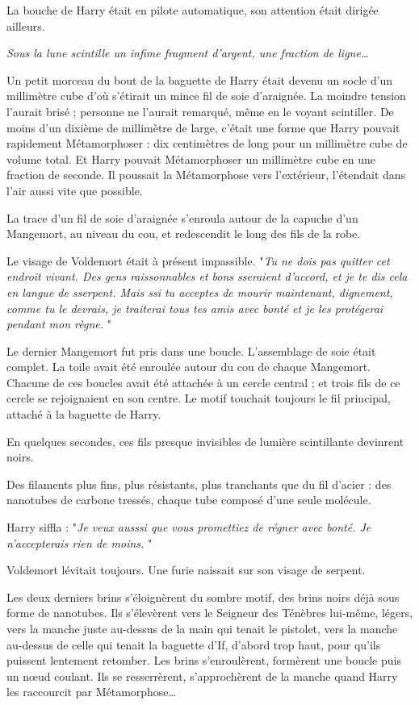 La bouche de Harry était en pilote automatique, son attention était dirigée ailleurs.

\emph{Sous la lune scintille un infime fragment d'argent, une fraction de ligne…} 

Un petit morceau du bout de la baguette de Harry était devenu un socle d'un millimètre cube d'où s'étirait un mince fil de soie d'araignée. La moindre tension l'aurait brisé ; personne ne l'aurait remarqué, même en le voyant scintiller. De moins d'un dixième de millimètre de large, c'était une forme que Harry pouvait rapidement Métamorphoser : dix centimètres de long pour un millimètre cube de volume total. Et Harry pouvait Métamorphoser un millimètre cube en une fraction de seconde. Il poussait la Métamorphose vers l'extérieur, l'étendait dans l'air aussi vite que possible.

La trace d'un fil de soie d'araignée s'enroula autour de la capuche d'un Mangemort, au niveau du cou, et redescendit le long des fils de la robe.

Le visage de Voldemort était à présent impassible. "\emph{Tu ne dois pas quitter cet endroit vivant. Des gens raissonnables et bons sseraient d'accord, et je te dis cela en langue de sserpent. Mais ssi tu acceptes de mourir maintenant, dignement, comme tu le devrais, je traiterai tous tes amis avec bonté et je les protégerai pendant mon règne.} "

Le dernier Mangemort fut pris dans une boucle. L'assemblage de soie était complet. La toile avait été enroulée autour du cou de chaque Mangemort. Chacune de ces boucles avait été attachée à un cercle central ; et trois fils de ce cercle se rejoignaient en son centre. Le motif touchait toujours le fil principal, attaché à la baguette de Harry.

En quelques secondes, ces fils presque invisibles de lumière scintillante devinrent noirs.

Des filaments plus fins, plus résistants, plus tranchants que du fil d'acier : des nanotubes de carbone tressés, chaque tube composé d'une seule molécule.

Harry siffla : "\emph{Je veux ausssi que vous promettiez de régner avec bonté. Je n'accepterais rien de moins.} "

Voldemort lévitait toujours. Une furie naissait sur son visage de serpent.

Les deux derniers brins s'éloignèrent du sombre motif, des brins noirs déjà sous forme de nanotubes. Ils s'élevèrent vers le Seigneur des Ténèbres lui-même, légers, vers la manche juste au-dessus de la main qui tenait le pistolet, vers la manche au-dessus de celle qui tenait la baguette d'If, d'abord trop haut, pour qu'ils puissent lentement retomber. Les brins s'enroulèrent, formèrent une boucle puis un nœud coulant. Ils se resserrèrent, s'approchèrent de la manche quand Harry les raccourcit par Métamorphose…


